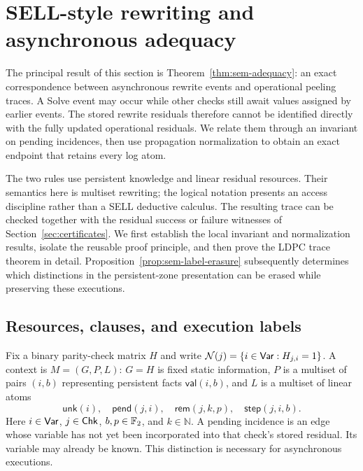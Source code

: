 \section{SELL-style rewriting and asynchronous adequacy}
\label{sec:sem}

The principal result of this section is Theorem~\ref{thm:sem-adequacy}:
an exact correspondence between asynchronous rewrite events and operational
peeling traces. A Solve event may occur while other checks still await values
assigned by earlier events. The stored rewrite residuals therefore cannot be
identified directly with the fully updated operational residuals. We relate
them through an invariant on pending incidences, then use propagation
normalization to obtain an exact endpoint that retains every log atom.

The two rules use persistent knowledge and linear residual resources. Their
semantics here is multiset rewriting; the logical notation presents an access
discipline rather than a SELL deductive calculus. The resulting trace can be
checked together with the residual success or failure witnesses of
Section~\ref{sec:certificates}. We first establish the local invariant and
normalization results, isolate the reusable proof principle, and then prove
the LDPC trace theorem in detail. Proposition~\ref{prop:sem-label-erasure}
subsequently determines which distinctions in the persistent-zone presentation
can be erased while preserving these executions.

\subsection{Resources, clauses, and execution labels}
\label{sec:sem-resources}

Fix a binary parity-check matrix $H$ and write
$\mathcal{N}(j)=\{i\in\mathsf{Var}:H_{j,i}=1\}$. A context is $M=(G,P,L)$: $G=H$ is fixed
static information, $P$ is a multiset of pairs $(i,b)$ representing persistent
facts $\mathsf{val}(i,b)$, and $L$ is a multiset of linear atoms
\[
 \mathsf{unk}(i),\quad \mathsf{pend}(j,i),\quad
 \mathsf{rem}(j,k,p),\quad \mathsf{step}(j,i,b).
\]
Here $i\in\mathsf{Var}$, $j\in\mathsf{Chk}$, $b,p\in\mathbb{F}_2$, and $k\in\mathbb N$.
A pending incidence is an edge whose variable has not yet been incorporated
into that check's stored residual. Its variable may already be known.
This distinction is necessary for asynchronous executions.

